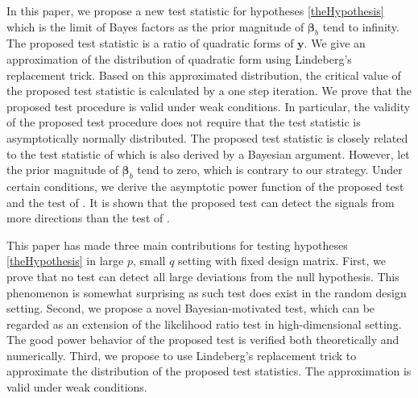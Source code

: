 \documentclass[smallextended]{svjour3}       %
\DeclareMathOperator{\myE}{E}
\DeclareMathOperator{\myVar}{Var}
\newcommand{\By}{\mathbf{y}}    \newcommand{\Bz}{\mathbf{z}}
\newcommand{\bfsym}[1]{\ensuremath{\boldsymbol{#1}}}
\def\bbeta{\bfsym \beta}
\begin{document}
In this paper, we propose a new test statistic for hypotheses \eqref{theHypothesis} which is the limit of Bayes factors as the prior magnitude of $\bbeta_b$ tend to infinity.
The proposed test statistic is a ratio of quadratic forms of $\By$.
We give an approximation of the distribution of quadratic form using Lindeberg's replacement trick.
Based on this approximated distribution, the critical value of the proposed test statistic is calculated by a one step iteration.
We prove that the proposed test procedure is valid under weak conditions.
In particular, the validity of the proposed test procedure does not require that the test statistic is asymptotically normally distributed.
The proposed test statistic is closely related to the test statistic of \cite{Goeman2006} which is also derived by a Bayesian argument.
However, \cite{Goeman2006} let the prior magnitude of $\bbeta_b$ tend to zero, which is contrary to our strategy.
Under certain conditions, we derive the asymptotic power function of the proposed test and the test of \cite{Goeman2006}.
It is shown that the proposed test can detect the signals from more directions than the test of \cite{Goeman2006}.


This paper has made three main contributions for testing hypotheses \eqref{theHypothesis} in large $p$, small $q$ setting with fixed design matrix.
First, we prove that no test can detect all large deviations from the null hypothesis.
This phenomenon is somewhat surprising as such test does exist in the random design setting.
Second, we propose a novel Bayesian-motivated test, which can be regarded as an extension of the likelihood ratio test in high-dimensional setting.
The good power behavior of the proposed test is verified both theoretically and numerically.
Third, we propose to use Lindeberg's replacement trick to approximate the distribution of the proposed test statistics.
The approximation is valid under weak conditions.
\end{document}
